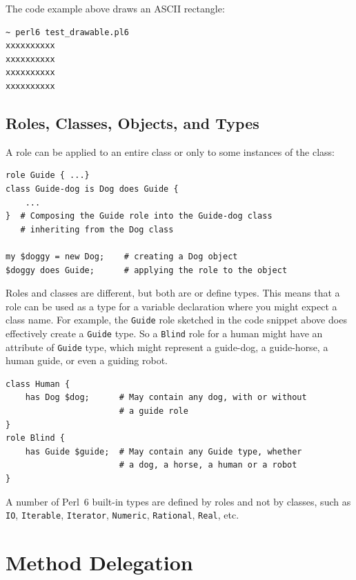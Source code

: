 The code example above draws an ASCII rectangle:
\begin{verbatim}
~ perl6 test_drawable.pl6
xxxxxxxxxx
xxxxxxxxxx
xxxxxxxxxx
xxxxxxxxxx
\end{verbatim}

\subsection{Roles, Classes, Objects, and Types}

A role can be applied to an entire class or only to some 
instances of the class:

\begin{verbatim}
role Guide { ...}
class Guide-dog is Dog does Guide { 
    ... 
}  # Composing the Guide role into the Guide-dog class
   # inheriting from the Dog class

my $doggy = new Dog;    # creating a Dog object
$doggy does Guide;      # applying the role to the object
\end{verbatim}

Roles and classes are different, but both are or define types.
This means that a role can be used as a type for a variable 
declaration where you might expect a class name. For example, 
the {\tt Guide} role sketched in the code snippet above does 
effectively create a {\tt Guide} type. So a {\tt Blind} role for 
a human might have an attribute of {\tt Guide} type, which 
might represent a guide-dog, a guide-horse, a human guide, or 
even a guiding robot.

\begin{verbatim}
class Human {
    has Dog $dog;      # May contain any dog, with or without
                       # a guide role
}
role Blind {
    has Guide $guide;  # May contain any Guide type, whether 
                       # a dog, a horse, a human or a robot
}
\end{verbatim}

A number of Perl~6 built-in types are defined by roles and 
not by classes, such as {\tt IO}, {\tt Iterable}, 
{\tt Iterator}, {\tt Numeric}, {\tt Rational}, {\tt Real},
etc.

\section{Method Delegation}

